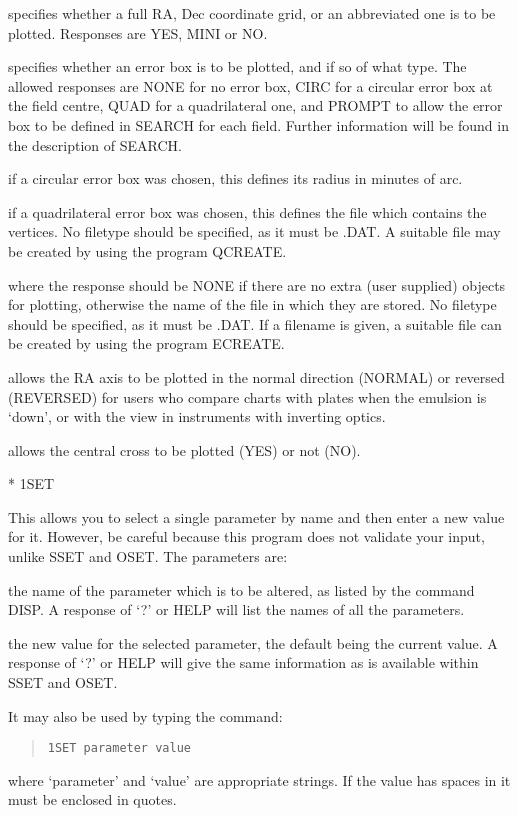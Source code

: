 \documentclass{article}
\begin{document}
\begin{list}{}{\setlength{\leftmargin}{20mm}
\setlength{\labelsep}{5mm}
\setlength{\labelwidth}{5mm}
}
\item[{\bf GRID}]
specifies whether a full RA, Dec coordinate grid, or an abbreviated one
is to be plotted.
Responses are YES, MINI or NO.

\item[{\bf ERRBOX}]
specifies whether an error box is to be plotted, and if so of what type.
The allowed responses are NONE for no error box, CIRC for a circular error box
at the field centre, QUAD for a quadrilateral one, and PROMPT to allow the error
box to be defined in SEARCH for each field.
Further information will be found in the description of SEARCH.

\item[{\bf RADIUS}]
if a circular error box was chosen, this defines its radius in minutes
of arc.

\item[{\bf COORDS}]
if a quadrilateral error box was chosen, this defines the file which
contains the vertices.
No filetype should be specified, as it must be .DAT.
A suitable file may be created by using the program QCREATE.

\item[{\bf EXTRA}]
where the response should be NONE if there are no extra (user supplied)
objects for plotting, otherwise the name of the file in which they are stored.
No filetype should be specified, as it must be .DAT.
If a filename is given, a suitable file can be created by using the program
ECREATE.

\item[{\bf DIRECT}]
allows the RA axis to be plotted in the normal direction (NORMAL) or
reversed (REVERSED) for users who compare charts with plates when the emulsion
is `down', or with the view in instruments with inverting optics.

\item[{\bf CROSS}]
allows the central cross to be plotted (YES) or not (NO).
\end{list}

* 1SET

This allows you to select a single parameter by name and then enter a new value
for it.
However, be careful because this program does not validate your input, unlike
SSET and OSET.
The parameters are:
\begin{list}{}{\setlength{\leftmargin}{20mm}
\setlength{\labelsep}{5mm}
\setlength{\labelwidth}{5mm}
}
\item[{\bf PARAMETER}]
the name of the parameter which is to be altered, as listed by
the command DISP.
A response of `?' or HELP will list the names of all the parameters.

\item[{\bf VALUE}]
the new value for the selected parameter, the default being the current value.
A response of `?' or HELP will give the same information as is available within
SSET and OSET.
\end{list}
It may also be used by typing the command:
\begin{quote}
{\tt 1SET parameter value}
\end{quote}
where `parameter' and `value' are appropriate strings.
If the value has spaces in it must be enclosed in quotes.
\end{document}
